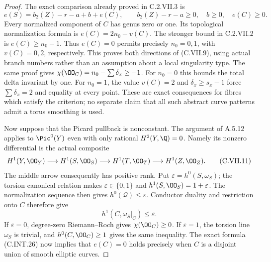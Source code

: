 \begin{proof}
The exact comparison already proved in
C.2.VII.3 is
\[
 e(S)=b_2(Z)-r-a+b+e(C),
 \qquad b_2(Z)-r-a\ge0,\quad b\ge0,\quad e(C)\ge0.
 \tag{C.VII.10}
\]
Every normalized component of $C$ has genus
zero or one. Its topological normalization
formula is $e(C)=2n_0-v(C)$. The stronger
bound in C.2.VII.2 is $e(C)\ge n_0-1$.
Thus $e(C)=0$ permits precisely $n_0=0,1$,
with $v(C)=0,2$, respectively. This proves
both directions of (C.VII.9), using actual
branch numbers rather than an assumption
about a local singularity type.
The same proof gives
$\chi(\OO_C)=n_0-\sum\delta_x\ge-1$.
For $n_0=0$ this bounds the total delta
invariant by one. For $n_0=1$, the value
$v(C)=2$ and $\delta_x\ge s_x-1$ force
$\sum\delta_x=2$ and equality at every point.
These are exact consequences for fibres which
satisfy the criterion; no separate claim
that all such abstract curve patterns admit
a torus smoothing is used.

Now suppose that the Picard pullback is
nonconstant. The argument of A.5.12 applies
to $\Pic^0(Y)$ even with only rational
$H^2(Y,\Q)=0$. Namely its nonzero differential
is the actual composite
\[
 H^1(Y,\OO_Y)\longrightarrow H^1(S,\OO_S)
 \longrightarrow H^1(T,\OO_T)
 \longrightarrow H^1(Z,\OO_Z).
 \tag{C.VII.11}
\]
The middle arrow consequently has positive
rank. Put $\varepsilon=h^0(S,\omega_S)$;
the torsion canonical relation makes
$\varepsilon\in\{0,1\}$ and
$h^1(S,\OO_S)=1+\varepsilon$.
The normalization sequence then gives
$h^0(\mathcal Q)\le\varepsilon$.
Conductor duality and restriction onto $C$
therefore give
\[
 h^1(C,\omega_S|_C)\le\varepsilon.
 \tag{C.VII.12}
\]
If $\varepsilon=0$, degree-zero
Riemann--Roch gives $\chi(\OO_C)\ge0$.
If $\varepsilon=1$, the torsion line
$\omega_S$ is trivial, and
$h^0(C,\OO_C)\ge1$ gives the same inequality.
The exact formula (C.INT.26) now implies
that $e(C)=0$ holds precisely when $C$ is
a disjoint union of smooth elliptic curves.


\end{proof}
